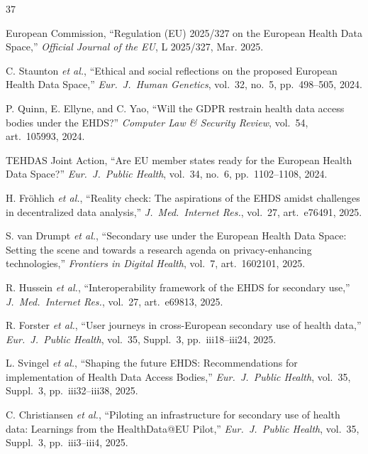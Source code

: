 \documentclass[conference]{IEEEtran}
\begin{document}
\begin{thebibliography}{37}

European Commission, ``Regulation (EU) 2025/327 on the European Health Data Space,'' \textit{Official Journal of the EU}, L 2025/327, Mar. 2025.

C. Staunton \textit{et al.}, ``Ethical and social reflections on the proposed European Health Data Space,'' \textit{Eur.~J.~Human Genetics}, vol.~32, no.~5, pp.~498--505, 2024.

P. Quinn, E. Ellyne, and C. Yao, ``Will the GDPR restrain health data access bodies under the EHDS?'' \textit{Computer Law \& Security Review}, vol.~54, art.~105993, 2024.

TEHDAS Joint Action, ``Are EU member states ready for the European Health Data Space?'' \textit{Eur.~J.~Public Health}, vol.~34, no.~6, pp.~1102--1108, 2024.

H. Fr\"ohlich \textit{et al.}, ``Reality check: The aspirations of the EHDS amidst challenges in decentralized data analysis,'' \textit{J.~Med.~Internet Res.}, vol.~27, art.~e76491, 2025.

S. van Drumpt \textit{et al.}, ``Secondary use under the European Health Data Space: Setting the scene and towards a research agenda on privacy-enhancing technologies,'' \textit{Frontiers in Digital Health}, vol.~7, art.~1602101, 2025.

R. Hussein \textit{et al.}, ``Interoperability framework of the EHDS for secondary use,'' \textit{J.~Med.~Internet Res.}, vol.~27, art.~e69813, 2025.

R. Forster \textit{et al.}, ``User journeys in cross-European secondary use of health data,'' \textit{Eur.~J.~Public Health}, vol.~35, Suppl.~3, pp.~iii18--iii24, 2025.

L. Svingel \textit{et al.}, ``Shaping the future EHDS: Recommendations for implementation of Health Data Access Bodies,'' \textit{Eur.~J.~Public Health}, vol.~35, Suppl.~3, pp.~iii32--iii38, 2025.

C. Christiansen \textit{et al.}, ``Piloting an infrastructure for secondary use of health data: Learnings from the HealthData@EU Pilot,'' \textit{Eur.~J.~Public Health}, vol.~35, Suppl.~3, pp.~iii3--iii4, 2025.


\end{thebibliography}
\end{document}

